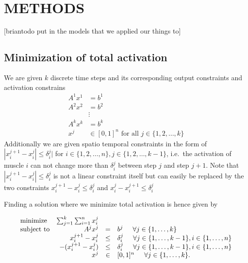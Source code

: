 \section{METHODS}
[briantodo put in the models that we applied our things to]
\subsection{Minimization of total activation}
\label{sub:minimization_of_total_activation} %
We are given $k$ discrete time steps and its corresponding output constraints and activation constrains
\begin{align*}
A^1 x^1 &= b^1 \\
A^2 x^2 &= b^2 \\
 &\vdots \\
A^k x^k &= b^k \\
x^j &\in [0,1]^n \text{ for all } j \in \{1,2,\dots,k\} 
\end{align*}
Additionally we are given spatio temporal constraints in the form of $|x_i^{j+1} - x_i^{j}| \leq \delta_i^j|$ for $i \in \{1,2,\dots,n\}, j \in \{1,2,\dots,k-1\}$, i.e.\ the activation of muscle $i$ can not change more than $\delta_i^j$ between step $j$ and step $j+1$. Note that $|x_i^{j+1} - x_i^{j}| \leq \delta_i^j$ is not a linear constraint itself but can easily be replaced by the two constraints $x_i^{j+1} - x_i^{j} \leq \delta_i^j$ and $x_i^{j} - x_i^{j+1} \leq \delta_i^j$

Finding a solution where we minimize total activation is hence given by

\begin{equation}
\begin{array}{lrcl}
\mbox{minimize} & \sum_{j=1}^k \sum_{i=1}^n x_i^j \\ 
\mbox{subject to} & A^j x^j &=& b^j \hspace{5mm} \forall j \in \{1,\dots, k\} \\
  & x_i^{j+1} - x_i^{j} &\leq& \delta_i^j  \hspace{5mm} \forall j \in \{1,\dots, k-1\}, i \in \{1,\dots,n\} \\
  &  -(x_i^{j+1} - x_i^{j}) &\leq& \delta_i^j  \hspace{5mm} \forall j \in \{1,\dots, k-1\}, i \in \{1,\dots,n\} \\
  & x^j &\in& [0,1]^n \hspace{5mm} \forall j \in \{1,\dots, k\}.
\end{array}
\end{equation}

